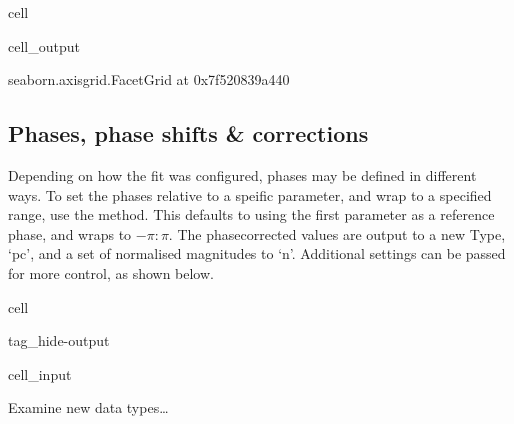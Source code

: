 \documentclass[letterpaper,table,10pt,english]{jupyterBook}
\begin{document}
\begin{sphinxuseclass}{cell}
\begin{sphinxVerbatimOutput}
\begin{sphinxuseclass}{cell_output}
\begin{sphinxVerbatim}[commandchars=\\\{\}]
\PYGZlt{}seaborn.axisgrid.FacetGrid at 0x7f520839a440\PYGZgt{}
\end{sphinxVerbatim}

\noindent{}

\end{sphinxuseclass}\end{sphinxVerbatimOutput}

\end{sphinxuseclass}

\subsection{Phases, phase shifts \& corrections}
\label{\detokenize{part2/case-study-N2_290723:phases-phase-shifts-corrections}}
\sphinxAtStartPar
Depending on how the fit was configured, phases may be defined in different ways. To set the phases relative to a speific parameter, and wrap to a specified range, use the  method. This defaults to using the first parameter as a reference phase, and wraps to \(-\pi:\pi\). The phase\sphinxhyphen{}corrected values are output to a new Type, ‘pc’, and a set of normalised magnitudes to ‘n’. Additional settings can be passed for more control, as shown below.

\begin{sphinxuseclass}{cell}
\begin{sphinxuseclass}{tag_hide-output}\begin{sphinxVerbatimInput}

\begin{sphinxuseclass}{cell_input}
\begin{sphinxVerbatim}[commandchars=\\\{\}]
 
\end{sphinxVerbatim}

\end{sphinxuseclass}\end{sphinxVerbatimInput}

\end{sphinxuseclass}
\end{sphinxuseclass}
\sphinxAtStartPar
Examine new data types…
\end{document}

